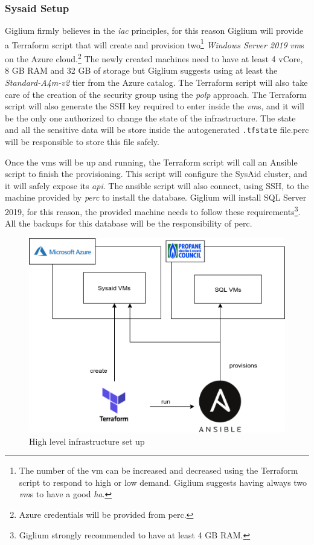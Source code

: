 \subsubsection{Sysaid Setup}\label{setup}
Giglium firmly believes in the \textit{\gls{iac}} principles, for this reason Giglium will provide a Terraform\cite{terraform} script that will create and provision two\footnote{The number of the \gls{vm} can be increased and decreased using the Terraform script to respond to high or low demand.
Giglium suggests having always two \textit{\gls{vm}}s to have a good \textit{\gls{ha}}.} \textit{Windows Server 2019} \textit{\gls{vm}}s on the Azure\cite{azure} cloud.\footnote{Azure credentials will be provided from \gls{perc}.} 
The newly created machines need to have at least 4 vCore, 8 GB RAM and 32 GB of storage\cite{sysaid_requirements} but Giglium suggests using at least the \textit{Standard-A4m-v2} tier from the Azure catalog. The Terraform script will also take care of the creation of the security group using the \textit{\gls{polp}} approach.
The Terraform script will also generate the SSH key required to enter inside the \textit{\gls{vm}}s, and it will be the only one authorized to change the state of the infrastructure. The state and all the sensitive data will be store inside the autogenerated \texttt{.tfstate} file.\gls{perc} will be responsible to store this file safely. 

Once the \gls{vm}s will be up and running, the Terraform script will call an Ansible\cite{ansible} script to finish the provisioning. This script will configure the SysAid cluster, and it will safely expose its \textit{\gls{api}}. The ansible script will also connect, using SSH, to the machine provided by \textit{\gls{perc}} to install the database. Giglium will install SQL Server 2019, for this reason, the provided machine needs to follow these requirements\cite{sql_requirements}\footnote{Giglium strongly recommended to have at least 4 GB RAM.}. All the backups for this database will be the responsibility of \gls{perc}.

\begin{figure}[ht!]
	\centering
	\includegraphics[width=120mm]{./img/implementations/setup.png}
	\caption{High level infrastructure set up}\label{fig:high-level-infrastructure-set-up}
\end{figure}

